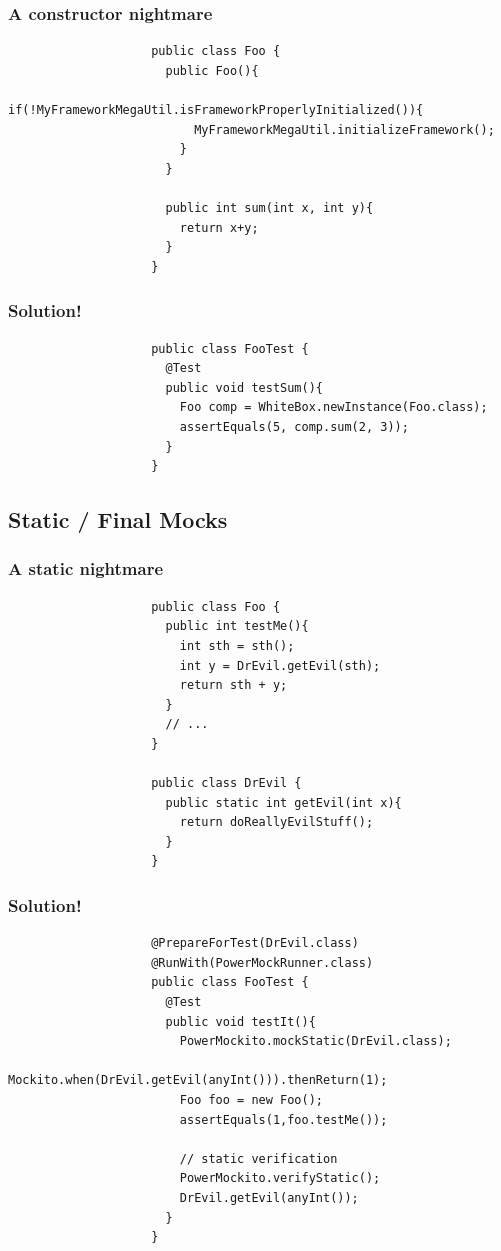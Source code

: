 \documentclass{beamer}
\begin{document}
			\begin{frame}[fragile]
				\frametitle{A constructor nightmare}

				\begin{lstlisting}
					public class Foo {
					  public Foo(){
					    if(!MyFrameworkMegaUtil.isFrameworkProperlyInitialized()){
					      MyFrameworkMegaUtil.initializeFramework();	
					    }
					  }

					  public int sum(int x, int y){
					    return x+y;
					  }
					}
				\end{lstlisting}
			\end{frame}

			\begin{frame}[fragile]
				\frametitle{Solution!}

				\begin{lstlisting}
					public class FooTest {
					  @Test
					  public void testSum(){
					    Foo comp = WhiteBox.newInstance(Foo.class);
					    assertEquals(5, comp.sum(2, 3));
					  }
					}
				\end{lstlisting}
			\end{frame}

		\subsection{Static / Final Mocks}

			\begin{frame}[fragile]
				\frametitle{A static nightmare}

				\begin{lstlisting}
					public class Foo {
					  public int testMe(){
					    int sth = sth();
					    int y = DrEvil.getEvil(sth);	
					    return sth + y;
					  }
					  // ...
					}

					public class DrEvil {
					  public static int getEvil(int x){
					    return doReallyEvilStuff();
					  }
					}
				\end{lstlisting}
			\end{frame}

			\begin{frame}[fragile]
				\frametitle{Solution!}

				\begin{lstlisting}
					@PrepareForTest(DrEvil.class)
					@RunWith(PowerMockRunner.class)
					public class FooTest {
					  @Test
					  public void testIt(){
					    PowerMockito.mockStatic(DrEvil.class);
					    Mockito.when(DrEvil.getEvil(anyInt())).thenReturn(1);
					    Foo foo = new Foo();
					    assertEquals(1,foo.testMe());

					    // static verification
					    PowerMockito.verifyStatic();
					    DrEvil.getEvil(anyInt());
					  }
					}
				\end{lstlisting}
			\end{frame}
\end{document}

